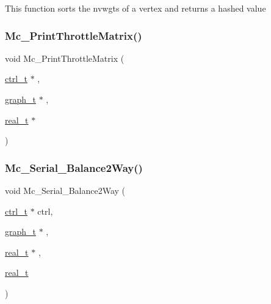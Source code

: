 This function sorts the nvwgts of a vertex and returns a hashed value \mbox{\label{a00951_ad6810e1ee9421028987b6971ee7eb45d}} 
\subsubsection{\texorpdfstring{Mc\+\_\+\+Print\+Throttle\+Matrix()}{Mc\_PrintThrottleMatrix()}}
{\footnotesize\ttfamily void Mc\+\_\+\+Print\+Throttle\+Matrix (\begin{DoxyParamCaption}\item[{\hyperlink{a00742}{ctrl\+\_\+t} $\ast$}]{,  }\item[{\hyperlink{a00734}{graph\+\_\+t} $\ast$}]{,  }\item[{\hyperlink{a00876_a1924a4f6907cc3833213aba1f07fcbe9}{real\+\_\+t} $\ast$}]{ }\end{DoxyParamCaption})}

\mbox{\label{a00951_a5f868aede1c48f50a306ba7d46d8b42b}} 
\subsubsection{\texorpdfstring{Mc\+\_\+\+Serial\+\_\+\+Balance2\+Way()}{Mc\_Serial\_Balance2Way()}}
{\footnotesize\ttfamily void Mc\+\_\+\+Serial\+\_\+\+Balance2\+Way (\begin{DoxyParamCaption}\item[{\hyperlink{a00742}{ctrl\+\_\+t} $\ast$}]{ctrl,  }\item[{\hyperlink{a00734}{graph\+\_\+t} $\ast$}]{,  }\item[{\hyperlink{a00876_a1924a4f6907cc3833213aba1f07fcbe9}{real\+\_\+t} $\ast$}]{,  }\item[{\hyperlink{a00876_a1924a4f6907cc3833213aba1f07fcbe9}{real\+\_\+t}}]{ }\end{DoxyParamCaption})}

